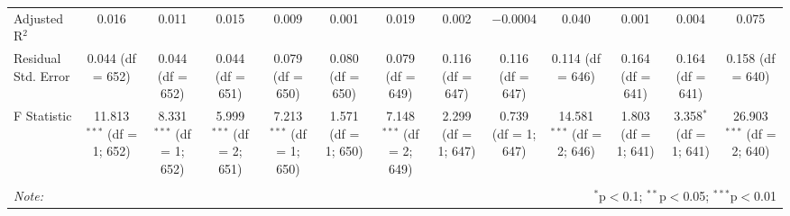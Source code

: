 \begin{table}[!htbp]
\begin{tabular}{@{\extracolsep{5pt}}lcccccccccccc}
Adjusted R$^{2}$ & 0.016 & 0.011 & 0.015 & 0.009 & 0.001 & 0.019 & 0.002 & $-$0.0004 & 0.040 & 0.001 & 0.004 & 0.075 \\ 
Residual Std. Error & 0.044 (df = 652) & 0.044 (df = 652) & 0.044 (df = 651) & 0.079 (df = 650) & 0.080 (df = 650) & 0.079 (df = 649) & 0.116 (df = 647) & 0.116 (df = 647) & 0.114 (df = 646) & 0.164 (df = 641) & 0.164 (df = 641) & 0.158 (df = 640) \\ 
F Statistic & 11.813$^{***}$ (df = 1; 652) & 8.331$^{***}$ (df = 1; 652) & 5.999$^{***}$ (df = 2; 651) & 7.213$^{***}$ (df = 1; 650) & 1.571 (df = 1; 650) & 7.148$^{***}$ (df = 2; 649) & 2.299 (df = 1; 647) & 0.739 (df = 1; 647) & 14.581$^{***}$ (df = 2; 646) & 1.803 (df = 1; 641) & 3.358$^{*}$ (df = 1; 641) & 26.903$^{***}$ (df = 2; 640) \\ 
\hline 
\hline \\[-1.8ex] 
\textit{Note:}  & \multicolumn{12}{r}{$^{*}$p$<$0.1; $^{**}$p$<$0.05; $^{***}$p$<$0.01} \\ 
\end{tabular} 
\end{table} 

